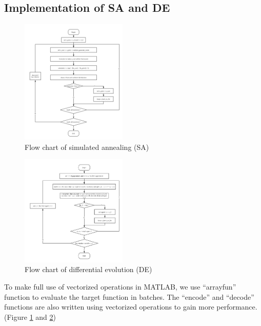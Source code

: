 \documentclass{IEEEtran}
\begin{document}
{{    }

    \subsection{Implementation of SA and DE}
    {
        \begin{figure}[!htbp]
            \centering
            \includegraphics[width=0.45\textwidth]{figures/SA_algorithm.png}
            \caption{Flow chart of simulated annealing (SA)}
            \label{fig:SA}
        \end{figure}

        \begin{figure}[!htbp]
            \centering
            \includegraphics[width=0.45\textwidth]{figures/DE_algorithm.png}
            \caption{Flow chart of differential evolution (DE)}
            \label{fig:DE}
        \end{figure}

        To make full use of vectorized operations in MATLAB, we use ``arrayfun'' function to evaluate the target function in batches. 
        The ``encode'' and ``decode'' functions are also written using vectorized operations to gain more performance. 
        (Figure \ref{fig:SA} and \ref{fig:DE})
    }

}
\end{document}
